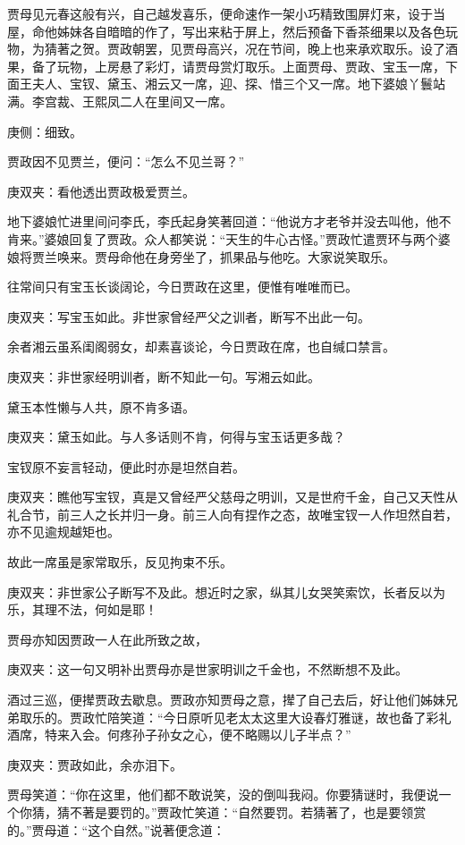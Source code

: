 \begin{parag}
    贾母见元春这般有兴，自己越发喜乐，便命速作一架小巧精致围屏灯来，设于当屋，命他姊妹各自暗暗的作了，写出来粘于屏上，然后预备下香茶细果以及各色玩物，为猜著之贺。贾政朝罢，见贾母高兴，况在节间，晚上也来承欢取乐。设了酒果，备了玩物，上房悬了彩灯，请贾母赏灯取乐。上面贾母、贾政、宝玉一席，下面王夫人、宝钗、黛玉、湘云又一席，迎、探、惜三个又一席。地下婆娘丫鬟站满。李宫裁、王熙凤二人在里间又一席。\begin{note}庚侧：细致。\end{note}贾政因不见贾兰，便问：“怎么不见兰哥？”\begin{note}庚双夹：看他透出贾政极爱贾兰。\end{note}地下婆娘忙进里间问李氏，李氏起身笑著回道：“他说方才老爷并没去叫他，他不肯来。”婆娘回复了贾政。众人都笑说：“天生的牛心古怪。”贾政忙遣贾环与两个婆娘将贾兰唤来。贾母命他在身旁坐了，抓果品与他吃。大家说笑取乐。
\end{parag}


\begin{parag}
    往常间只有宝玉长谈阔论，今日贾政在这里，便惟有唯唯而已。\begin{note}庚双夹：写宝玉如此。非世家曾经严父之训者，断写不出此一句。\end{note}余者湘云虽系闺阁弱女，却素喜谈论，今日贾政在席，也自缄口禁言。\begin{note}庚双夹：非世家经明训者，断不知此一句。写湘云如此。\end{note}黛玉本性懒与人共，原不肯多语。\begin{note}庚双夹：黛玉如此。与人多话则不肯，何得与宝玉话更多哉？\end{note}宝钗原不妄言轻动，便此时亦是坦然自若。\begin{note}庚双夹：瞧他写宝钗，真是又曾经严父慈母之明训，又是世府千金，自己又天性从礼合节，前三人之长并归一身。前三人向有捏作之态，故唯宝钗一人作坦然自若，亦不见逾规越矩也。\end{note}故此一席虽是家常取乐，反见拘束不乐。\begin{note}庚双夹：非世家公子断写不及此。想近时之家，纵其儿女哭笑索饮，长者反以为乐，其理不法，何如是耶！\end{note}贾母亦知因贾政一人在此所致之故，\begin{note}庚双夹：这一句又明补出贾母亦是世家明训之千金也，不然断想不及此。\end{note}酒过三巡，便撵贾政去歇息。贾政亦知贾母之意，撵了自己去后，好让他们姊妹兄弟取乐的。贾政忙陪笑道：“今日原听见老太太这里大设春灯雅谜，故也备了彩礼酒席，特来入会。何疼孙子孙女之心，便不略赐以儿子半点？”\begin{note}庚双夹：贾政如此，余亦泪下。\end{note}贾母笑道：“你在这里，他们都不敢说笑，没的倒叫我闷。你要猜谜时，我便说一个你猜，猜不著是要罚的。”贾政忙笑道：“自然要罚。若猜著了，也是要领赏的。”贾母道：“这个自然。”说著便念道：
\end{parag}


